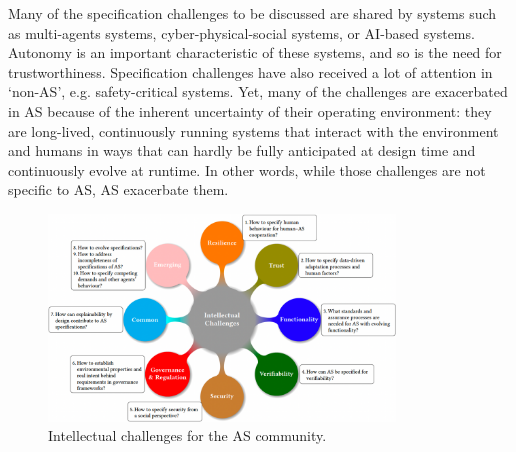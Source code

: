 \documentclass[sigconf,nonacm]{acmart}%
\begin{document}
Many of the specification challenges to be discussed are shared by systems such as multi-agents systems, cyber-physical-social systems, or AI-based systems. Autonomy is an important characteristic of these systems, and so is the need for trustworthiness. Specification challenges have also received a lot of attention in ‘non-AS’, e.g. safety-critical systems. Yet, many of the challenges are exacerbated in AS because of the inherent uncertainty of their operating environment: they are long-lived, continuously running systems that interact with the environment and humans in ways that can hardly be fully anticipated at design time and continuously evolve at runtime. In other words, while those challenges are not specific to AS, AS exacerbate them. 


	\begin{figure}
	\centering
	\includegraphics[width=0.82\textwidth]{figures/Intellectual-Challenges-V3.png}\vspace{-3mm}	%
	\caption{Intellectual challenges for the AS community.}	\vspace{-1mm}
	\label{Intellectual-challenges}
\end{figure}		
\end{document}
